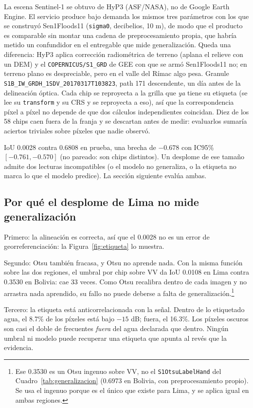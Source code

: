 \documentclass{article}
\begin{document}
La escena Sentinel-1 se obtuvo de HyP3 (ASF/NASA), no de Google Earth
Engine. El servicio produce bajo demanda los mismos tres parámetros con los que
se construyó Sen1Floods11 (\texttt{sigma0}, decibelios, 10 m), de modo que el
producto es comparable sin montar una cadena de preprocesamiento propia, que
habría metido un confundidor en el entregable que mide generalización. Queda una
diferencia: HyP3 aplica corrección radiométrica de terreno (aplana el relieve con
un DEM) y el \texttt{COPERNICUS/S1\_GRD} de GEE con que se armó Sen1Floods11 no;
en terreno plano es despreciable, pero en el valle del Rímac algo pesa.
Granule \texttt{S1B\_IW\_GRDH\_1SDV\_20170317T103823}, path 171 descendente, un
día antes de la delineación óptica. Cada chip se reproyecta a la grilla que
\emph{ya} tiene su etiqueta (se lee su \texttt{transform} y su CRS y se
reproyecta a eso), así que la correspondencia píxel a píxel no depende
de que dos cálculos independientes coincidan. Diez de los 58 chips caen fuera de
la franja y se descartan antes de medir: evaluarlos sumaría aciertos triviales
sobre píxeles que nadie observó.

IoU 0.0028 contra 0.6808
en prueba, una brecha de $-0.678$ con IC95\% $[-0.761, -0.570]$ (no pareado: son
chips distintos). Un desplome de ese tamaño admite dos lecturas incompatibles
(o el modelo no generaliza, o la etiqueta no marca lo que el modelo predice).
La sección siguiente evalúa ambas.

\subsection{Por qué el desplome de Lima no mide generalización}
\label{sec:etiqueta}

Primero: la alineación es correcta, así que el 0.0028 no es un error de
georreferenciación: la Figura~\ref{fig:etiqueta} lo muestra.

Segundo: Otsu también fracasa, y Otsu no aprende nada. Con la misma
función sobre las dos regiones, el umbral por chip sobre VV da IoU 0.0108 en
Lima contra 0.3530 en Bolivia: cae 33 veces. Como Otsu recalibra dentro de cada
imagen y no arrastra nada aprendido, su fallo no puede deberse a falta de
generalización.\footnote{Ese 0.3530 es un Otsu ingenuo sobre VV, no el
\texttt{S1OtsuLabelHand} del Cuadro~\ref{tab:generalizacion} (0.6973 en Bolivia,
con preprocesamiento propio). Se usa el ingenuo porque es el único que existe
para Lima, y se aplica igual en ambas regiones.}

Tercero: la etiqueta está anticorrelacionada con la señal.
Dentro de lo etiquetado agua, el 8.7\% de los píxeles está bajo $-15$ dB; fuera,
el 16.3\%. Los píxeles oscuros son casi el doble de frecuentes \emph{fuera} del
agua declarada que dentro. Ningún umbral ni modelo puede recuperar una etiqueta
que apunta al revés que la evidencia.
\end{document}
